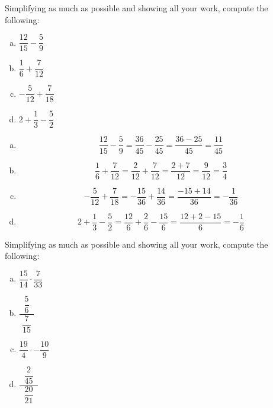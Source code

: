 \documentclass[11pt,letterpaper]{article}
\begin{document}
\newpage



 Simplifying as much as possible and showing all your work, compute the following:
	\begin{enumerate}[(a)]
	\item $\dfrac{12}{15} - \dfrac{5}{9}$
	\item $\dfrac{1}{6} + \dfrac{7}{12}$
	\item $-\dfrac{5}{12} + \dfrac{7}{18}$
	\item $2 + \dfrac{1}{3} - \dfrac{5}{2}$
	\end{enumerate} \pspace

\sol
\begin{enumerate}[(a)]
\item 
	\[
	\dfrac{12}{15} - \dfrac{5}{9}= \dfrac{36}{45} - \dfrac{25}{45}= \dfrac{36 - 25}{45}= \dfrac{11}{45}
	\] \pspace

\item 
	\[
	\dfrac{1}{6} + \dfrac{7}{12}= \dfrac{2}{12} + \dfrac{7}{12}= \dfrac{2 + 7}{12}= \dfrac{9}{12}= \dfrac{3}{4}
	\] \pspace

\item 
	\[
	-\dfrac{5}{12} + \dfrac{7}{18}= -\dfrac{15}{36} + \dfrac{14}{36}= \dfrac{-15 + 14}{36}= -\dfrac{1}{36}
	\] \pspace

\item 
	\[
	2 + \dfrac{1}{3} - \dfrac{5}{2}= \dfrac{12}{6} + \dfrac{2}{6} - \dfrac{15}{6}= \dfrac{12 + 2 - 15}{6}= -\dfrac{1}{6}
	\]
\end{enumerate} 



\newpage



 Simplifying as much as possible and showing all your work, compute the following:
	\begin{enumerate}[(a)]
	\item $\dfrac{15}{14} \cdot \dfrac{7}{33}$
	\item $\dfrac{\;\;\dfrac{5}{6}\;\;}{\dfrac{7}{15}}$
	\item $\dfrac{19}{4} \cdot -\dfrac{10}{9}$
	\item $\dfrac{\;\;\dfrac{2}{45}\;\;}{\dfrac{20}{21}}$
	\end{enumerate} \pspace
\end{document}
